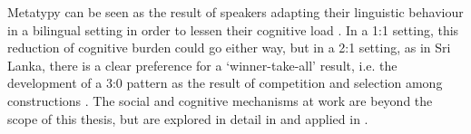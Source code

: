 Metatypy can be seen as the result of speakers adapting their linguistic behaviour in a bilingual setting in order to lessen their cognitive load \citep{Nadkarni1975,Ross2007}. In a 1:1 setting, this reduction of cognitive burden could go either way, but in a 2:1 setting, as in Sri Lanka, there is a clear preference for a `winner-take-all' result, i.e. the development of a 3:0 pattern  as the result of competition and selection among constructions \citep{Ansaldo2005ms}. The social and cognitive mechanisms at work are beyond the scope of this thesis, but are explored in detail in \citet{Ansaldo2009book} and applied in \citet{AnsaldoEtAlFCLT}.
 

 
 
% 
% 
% 
% 
% 
% 
